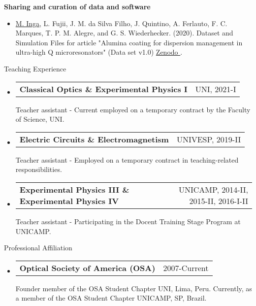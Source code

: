 \documentclass[letterpaper, 11pt]{article}[leftmargin=*]
\makeatletter
\renewcommand{\section}[2]{
  \colorbox{boxcol}{\color{secondary}\raggedbottom\normalsize{#1}{\hspace{2pt}#2}}
}
\newcommand{\resumeEntryStart}{\begin{itemize}[leftmargin=2.5mm]\itemsep8pt}
\newcommand{\resumeEntryEnd}{\end{itemize}}
\newcommand{\resumeItemListStart}{\begin{itemize}[leftmargin=4.5mm]\itemsep-3pt}
\newcommand{\resumeItemListEnd}{\end{itemize}}
\newcommand{\resumeItem}[1]{
  \item\small{
    {#1}
  }
}
\newcommand{\resumeEntryTD}[2]{
  \item[]
    \begin{tabularx}{0.97\textwidth}{X@{\hspace{60pt}}r}
      \textbf{\color{primary}#1} & {\firabook\color{accent}\small#2}
    \end{tabularx}\vspace{2pt}
}
\makeatother
\begin{document}
\textbf{Sharing and curation of data and software}
\vspace{-3pt}
\resumeItemListStart
\resumeItem {\footnotesize \underline{M. Inga}, L. Fujii, J. M. da Silva Filho, J. Quintino, A. Ferlauto, F. C. Marques, T. P. M. Alegre, and G. S. Wiederhecker. (2020). Dataset and Simulation Files for article "Alumina coating for dispersion management in ultra-high Q microresonators" (Data set v1.0) \href{https://zenodo.org/record/3932243}{Zenodo \faExternalLink}.}
\resumeItemListEnd

\section{\faPencil}{Teaching Experience}
\resumeEntryStart
\resumeEntryTD
{Classical Optics \& Experimental Physics I}{\footnotesize UNI, 2021-I\vspace{-0.2cm}} 
{\footnotesize Teacher assistant - Current employed on a temporary contract by the Faculty of Science, UNI.}
\vspace{-0.3cm}
\resumeEntryTD
{Electric Circuits \& Electromagnetism}{\footnotesize UNIVESP, 2019-II\vspace{-0.2cm}} 
{\footnotesize Teacher assistant - Employed on a temporary contract in teaching-related responsibilities.}
\vspace{-0.3cm}
\resumeEntryTD
{Experimental Physics III \& Experimental Physics IV}{\footnotesize UNICAMP, 2014-II, 2015-II, 2016-I-II\vspace{-0.2cm}}
{\footnotesize Teacher assistant - Participating in the Docent Training Stage Program at UNICAMP.}
\resumeEntryEnd

\section{\faGroup}{Professional Affiliation}
\resumeEntryStart
\resumeEntryTD
{Optical Society of America (OSA)}{\footnotesize 2007-Current}
{\footnotesize Founder member of the OSA Student Chapter UNI, Lima, Peru. Currently, as a member of the OSA Student Chapter UNICAMP, SP, Brazil.}
\resumeEntryEnd

\end{document}
